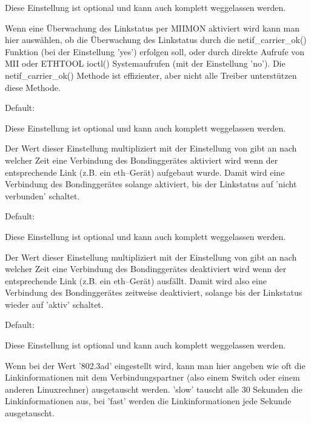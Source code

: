 \begin{description}
  Diese Einstellung ist optional und kann auch komplett weggelassen
  werden.

  Wenn eine Überwachung des Linkstatus per MIIMON aktiviert wird kann
  man hier auswählen, ob die Überwachung des Linkstatus durch die
  netif\_carrier\_ok() Funktion (bei der Einstellung 'yes') erfolgen
  soll, oder durch direkte Aufrufe von MII oder ETHTOOL ioctl()
  Systemaufrufen (mit der Einstellung 'no'). Die netif\_carrier\_ok()
  Methode ist effizienter, aber nicht alle Treiber unterstützen diese
  Methode.


  Default: 

  Diese Einstellung ist optional und kann auch komplett weggelassen
  werden.

  Der Wert dieser Einstellung multipliziert mit der Einstellung von
   gibt an nach welcher Zeit eine
  Verbindung des Bondinggerätes aktiviert wird wenn der entsprechende
  Link (z.B. ein eth--Gerät) aufgebaut wurde. Damit wird eine
  Verbindung des Bondinggerätes solange aktiviert, bis der Linkstatus
  auf 'nicht verbunden' schaltet.


  Default: 

  Diese Einstellung ist optional und kann auch komplett weggelassen
  werden.

  Der Wert dieser Einstellung multipliziert mit der Einstellung von
   gibt an nach welcher Zeit eine
  Verbindung des Bondinggerätes deaktiviert wird wenn der
  entsprechende Link (z.B. ein eth--Gerät) ausfällt. Damit wird also
  eine Verbindung des Bondinggerätes zeitweise deaktiviert, solange
  bis der Linkstatus wieder auf 'aktiv' schaltet.


  Default: 

  Diese Einstellung ist optional und kann auch komplett weggelassen
  werden.

  Wenn bei  der Wert '802.3ad'
  eingestellt wird, kann man hier angeben wie oft die
  Linkinformationen mit dem Verbindungspartner (also einem Switch oder
  einem anderen Linuxrechner) ausgetauscht werden. 'slow' tauscht alle
  30 Sekunden die Linkinformationen aus, bei 'fast' werden die
  Linkinformationen jede Sekunde ausgetauscht.


\end{description}
